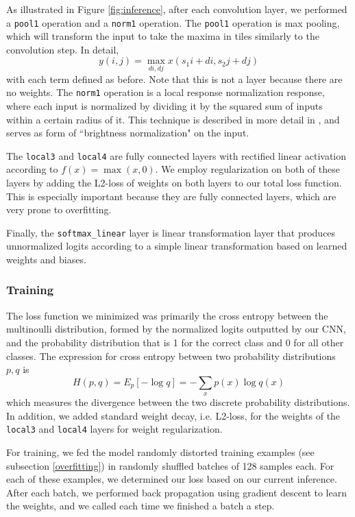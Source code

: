 \documentclass[10pt, twocolumn, twoside]{article}
\begin{document}
As illustrated in Figure \ref{fig:inference}, after each convolution layer, we performed a \texttt{pool1} operation and a \texttt{norm1} operation. The \texttt{pool1} operation is max pooling, which will transform the input to take the maxima in tiles similarly to the convolution step. In detail,
\[ y(i, j) = \max_{di, dj} x(s_1i + di, s_2j + dj)\]
with each term defined as before. Note that this is not a layer because there are no weights. The \texttt{norm1} operation is a local response normalization response, where each input is normalized by dividing it by the squared sum of inputs within a certain radius of it. This technique is described in more detail in \cite{Krizhevsky}, and serves as form of ``brightness normalization" on the input.

The \texttt{local3} and \texttt{local4} are fully connected layers with rectified linear activation according to $f(x) = \max(x, 0)$. We employ regularization on both of these layers by adding the L2-loss of weights on both layers to our total loss function. This is especially important because they are fully connected layers, which are very prone to overfitting.

Finally, the \texttt{softmax\_linear} layer is linear transformation layer that produces unnormalized logits according to a simple linear transformation based on learned weights and biases.

\subsubsection{Training}

The loss function we minimized was primarily the cross entropy between the multinoulli distribution, formed by the normalized logits outputted by our CNN, and the probability distribution that is 1 for the correct class and 0 for all other classes. The expression for cross entropy between two probability distributions $p, q$ is
\[H(p, q) = E_p[-\log q] = -\sum_x p(x)\log q(x)\]
which measures the divergence between the two discrete probability distributions. In addition, we added standard weight decay, i.e. L2-loss, for the weights of the \texttt{local3} and \texttt{local4} layers for weight regularization.

For training, we fed the model randomly distorted training examples (see subsection \ref{overfitting}) in randomly shuffled batches of 128 samples each. For each of these examples, we determined our loss based on our current inference. After each batch, we performed back propagation using gradient descent to learn the weights, and we called each time we finished a batch a step. 
\end{document}
